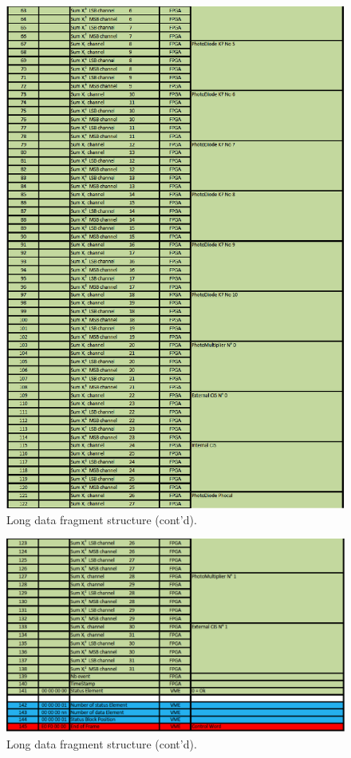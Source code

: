 \begin{appendices}
\begin{figure}[htbp]
\centering
\includegraphics[width=14cm]{figures/long_fragment_new_2.pdf}
\caption{Long data fragment structure (cont'd).}\label{fig:longfragb}
\end{figure}

\begin{figure}[htbp]
\centering
\includegraphics[width=14cm]{figures/long_fragment_new_3.pdf}
\caption{Long data fragment structure (cont'd).}\label{fig:longfragc}
\end{figure}



\end{appendices}
